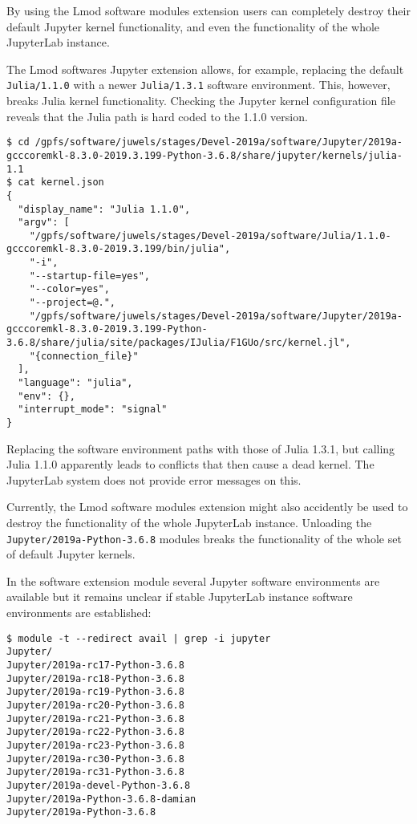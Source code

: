 \documentclass[11pt,a4paper]{article}
\begin{document}
By using the Lmod software modules extension users can completely destroy their default Jupyter kernel functionality, and even the functionality of the whole JupyterLab instance.

The Lmod softwares Jupyter extension allows, for example, replacing the default \verb|Julia/1.1.0| with a newer \verb|Julia/1.3.1| software environment.
This, however, breaks Julia kernel functionality.
Checking the Jupyter kernel configuration file reveals that the Julia path is hard coded to the 1.1.0 version.
%
\begin{verbatim}
$ cd /gpfs/software/juwels/stages/Devel-2019a/software/Jupyter/2019a-gcccoremkl-8.3.0-2019.3.199-Python-3.6.8/share/jupyter/kernels/julia-1.1
$ cat kernel.json
{
  "display_name": "Julia 1.1.0",
  "argv": [
    "/gpfs/software/juwels/stages/Devel-2019a/software/Julia/1.1.0-gcccoremkl-8.3.0-2019.3.199/bin/julia",
    "-i",
    "--startup-file=yes",
    "--color=yes",
    "--project=@.",
    "/gpfs/software/juwels/stages/Devel-2019a/software/Jupyter/2019a-gcccoremkl-8.3.0-2019.3.199-Python-3.6.8/share/julia/site/packages/IJulia/F1GUo/src/kernel.jl",
    "{connection_file}"
  ],
  "language": "julia",
  "env": {},
  "interrupt_mode": "signal"
}
\end{verbatim}
%
Replacing the software environment paths with those of Julia 1.3.1, but calling Julia 1.1.0 apparently leads to conflicts that then cause a dead kernel.
The JupyterLab system does not provide error messages on this.

Currently, the Lmod software modules extension might also accidently be used to destroy the functionality of the whole JupyterLab instance.
Unloading the \verb|Jupyter/2019a-Python-3.6.8| modules breaks the functionality of the whole set of default Jupyter kernels.

In the software extension module several Jupyter software environments are available but it remains unclear if stable JupyterLab instance software environments are established:
%
\begin{verbatim}
$ module -t --redirect avail | grep -i jupyter
Jupyter/
Jupyter/2019a-rc17-Python-3.6.8
Jupyter/2019a-rc18-Python-3.6.8
Jupyter/2019a-rc19-Python-3.6.8
Jupyter/2019a-rc20-Python-3.6.8
Jupyter/2019a-rc21-Python-3.6.8
Jupyter/2019a-rc22-Python-3.6.8
Jupyter/2019a-rc23-Python-3.6.8
Jupyter/2019a-rc30-Python-3.6.8
Jupyter/2019a-rc31-Python-3.6.8
Jupyter/2019a-devel-Python-3.6.8
Jupyter/2019a-Python-3.6.8-damian
Jupyter/2019a-Python-3.6.8
\end{verbatim}
\end{document}
